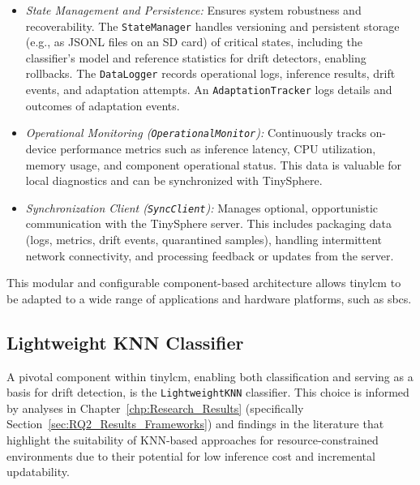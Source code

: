 \begin{itemize}
    \item \textit{State Management and Persistence:} Ensures system robustness and recoverability. The \texttt{StateManager} handles versioning and persistent storage (e.g., as JSONL files on an SD card) of critical states, including the classifier's model and reference statistics for drift detectors, enabling rollbacks. The \texttt{DataLogger} records operational logs, inference results, drift events, and adaptation attempts. An \texttt{AdaptationTracker} logs details and outcomes of adaptation events.
    \item \textit{Operational Monitoring (\texttt{OperationalMonitor}):} Continuously tracks on-device performance metrics such as inference latency, CPU utilization, memory usage, and component operational status. This data is valuable for local diagnostics and can be synchronized with TinySphere.
    \item \textit{Synchronization Client (\texttt{SyncClient}):} Manages optional, opportunistic communication with the TinySphere server. This includes packaging data (logs, metrics, drift events, quarantined samples), handling intermittent network connectivity, and processing feedback or updates from the server.
\end{itemize}

This modular and configurable component-based architecture allows \gls{tinylcm} to be adapted to a wide range of applications and hardware platforms, such as \glspl{sbc}.

\subsection{Lightweight KNN Classifier}
\label{ssec:LightweightKNN}

A pivotal component within \gls{tinylcm}, enabling both classification and serving as a basis for drift detection, is the \texttt{LightweightKNN} classifier. This choice is informed by analyses in Chapter~\ref{chp:Research_Results} (specifically Section~\ref{sec:RQ2_Results_Frameworks}) and findings in the literature \cite{disabatoTinyMachineLearning2024} that highlight the suitability of KNN-based approaches for resource-constrained environments due to their potential for low inference cost and incremental updatability.

